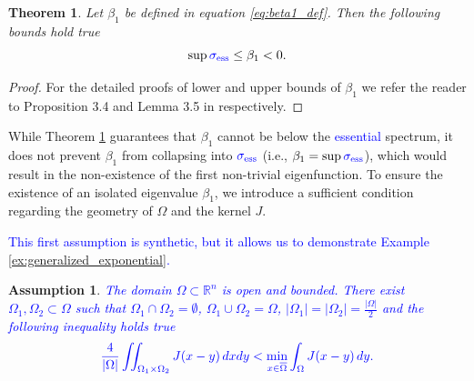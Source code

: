 \documentclass[12pt, a4paper]{article}
\newcommand{\revision}[1]{\textcolor{blue}{#1}}
\theoremstyle{break}
\newtheorem{thm}{Theorem}[section]
\theoremstyle{break}
\theoremstyle{break}
\newtheorem{asm}{Assumption}[section]
\theoremstyle{break}
\theoremstyle{break}
\theoremstyle{break}
\theoremstyle{break}
\theoremstyle{break}
\theoremstyle{break}
\begin{document}
\begin{thm}
    \label{thm:beta1_bounds_restated}
    Let $\beta_1$ be defined in equation \eqref{eq:beta1_def}. Then the following bounds hold true
    \begin{equation}
        \sup \revision{\sigma_{\mathrm{ess}}} \leq \beta_1 < 0.
    \end{equation}
\end{thm}
\begin{proof}
    For the detailed proofs of lower and upper bounds of $\beta_1$ we refer the reader to Proposition 3.4 and Lemma 3.5 in \cite{AndreuVaillo2010} respectively.
\end{proof}

While Theorem \ref{thm:beta1_bounds_restated} guarantees that $\beta_1$ cannot be below the \revision{essential} spectrum, it does not prevent $\beta_1$ from collapsing into $\revision{\sigma_{\mathrm{ess}}}$ (i.e., $\beta_1 = \sup \revision{\sigma_{\mathrm{ess}}}$), which would result in the non-existence of the first non-trivial eigenfunction. To ensure the existence of an isolated eigenvalue $\beta_1$, we introduce a sufficient condition regarding the geometry of $\Omega$ and the kernel $J$.

\revision{This first assumption is synthetic, but it allows us to demonstrate Example \ref{ex:generalized_exponential}.}

\begin{asm}
    \label{asm:DomainProperties_1}
    \revision{The domain $\Omega \subset \mathbb{R}^n$ is open and bounded. There exist $\Omega_1, \Omega_2 \subset \Omega$ such that $\Omega_1 \cap \Omega_2 = \emptyset$, $\Omega_1 \cup \Omega_2 = \Omega$, $|\Omega_1| = |\Omega_2| = \frac{|\Omega|}{2}$ and the following inequality holds true}
    \begin{equation}\label{eq:sufficient_cond}
        \revision{\frac{4}{|\Omega|} \iint_{\Omega_1 \times \Omega_2} J(x-y) \, dx dy < \min_{x \in \overline{\Omega}} \int_\Omega J(x-y) \, dy.}
    \end{equation}
\end{asm}
\end{document}

